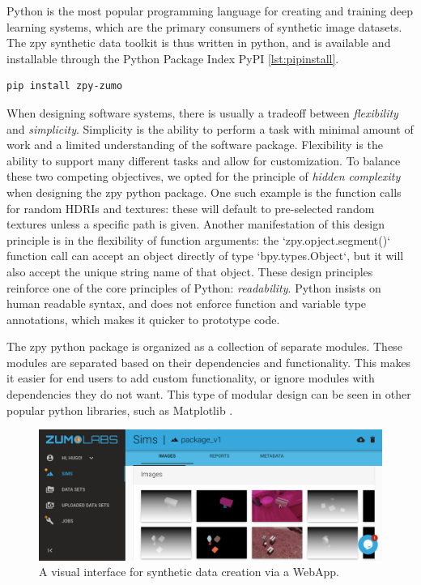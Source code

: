 \documentclass{article}
\begin{document}
Python is the most popular programming language for creating and training deep learning systems, which are the primary consumers of synthetic image datasets. The zpy synthetic data toolkit is thus written in python, and is available and installable through the Python Package Index PyPI \ref{lst:pipinstall}.

\begin{lstlisting}[language=bash,caption={Installing the zpy python module.},label={lst:pipinstall}]
pip install zpy-zumo
\end{lstlisting}

When designing software systems, there is usually a tradeoff between \emph{flexibility} and \emph{simplicity}. Simplicity is the ability to perform a task with minimal amount of work and a limited understanding of the software package. Flexibility is the ability to support many different tasks and allow for customization. To balance these two competing objectives, we opted for the principle of \emph{hidden complexity} when designing the zpy python package. One such example is the function calls for random HDRIs and textures: these will default to pre-selected random textures unless a specific path is given. Another manifestation of this design principle is in the flexibility of function arguments: the `zpy.opject.segment()` function call can accept an object directly of type `bpy.types.Object`, but it will also accept the unique string name of that object. These design principles reinforce one of the core principles of Python: \emph{readability}. Python insists on human readable syntax, and does not enforce function and variable type annotations, which makes it quicker to prototype code.


The zpy python package is organized as a collection of separate modules. These modules are separated based on their dependencies and functionality. This makes it easier for end users to add custom functionality, or ignore modules with dependencies they do not want. This type of modular design can be seen in other popular python libraries, such as Matplotlib \cite{Hunter:2007}.

\begin{figure}
	\centering
	\includegraphics[width=\textwidth]{webapp.png}
	\caption{A visual interface for synthetic data creation via a WebApp.}
	\label{fig:webapp}
\end{figure}
\end{document}
